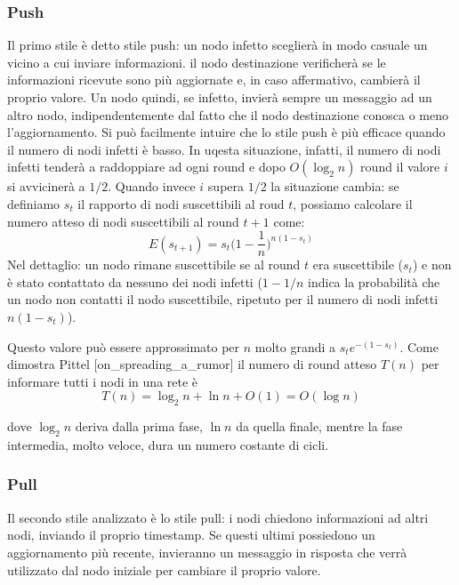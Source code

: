 \subsubsection{Push}
Il primo stile è detto stile push: un nodo infetto sceglierà in modo casuale un vicino a cui inviare informazioni. il nodo destinazione verificherà se le informazioni ricevute sono più aggiornate e, in caso affermativo, cambierà il proprio valore. Un nodo quindi, se infetto, invierà sempre un messaggio ad un altro nodo, indipendentemente dal fatto che il nodo destinazione conosca o meno l'aggiornamento. Si può facilmente intuire che lo stile push è più efficace quando il numero di nodi infetti è basso. In uqesta situazione, infatti, il numero di nodi infetti tenderà a raddoppiare ad ogni round e dopo $O(\log_2 n)$ round il valore $i$ si avvicinerà a $1/2$. Quando invece $i$ supera $1/2$ la situazione cambia: se definiamo $s_t$ il rapporto di nodi suscettibili al roud $t$, possiamo calcolare il numero atteso di nodi suscettibili al round $t + 1$ come:
\begin{equation}
    E(s_{t + 1}) = s_t  \Big(1 - \frac{1}{n}\Big)^{n(1-s_t)}
\end{equation}
Nel dettaglio: un nodo rimane suscettibile se al round $t$ era suscettibile ($s_t$) e non è stato contattato da nessuno dei nodi infetti ($1-1/n$ indica la probabilità che un nodo non contatti il nodo suscettibile, ripetuto per il numero di nodi infetti $n(1-s_t)$).

Questo valore può essere approssimato per $n$ molto grandi a $s_t e^{-(1-s_t)}$. Come dimostra Pittel [on\_spreading\_a\_rumor] il numero di round atteso $T(n)$ per informare tutti i nodi in una rete è
\begin{equation}
    T(n)= \log_2 n + \ln n + O(1) = O(\log n)
\end{equation}

dove $\log_2 n$ deriva dalla prima fase, $\ln n$ da quella finale, mentre la fase intermedia, molto veloce, dura un numero costante di cicli.
\subsubsection{Pull}
Il secondo stile analizzato è lo stile pull: i nodi chiedono informazioni ad altri nodi, inviando il proprio timestamp. Se questi ultimi possiedono un aggiornamento più recente, invieranno un messaggio in risposta che verrà utilizzato dal nodo iniziale per cambiare il proprio valore.

